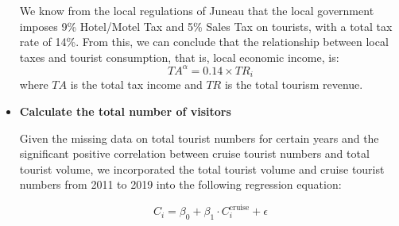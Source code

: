 \documentclass{mcmthesis}
\begin{document}
\begin{itemize}
  We know from the local regulations of Juneau that the local government imposes 9\% Hotel/Motel Tax and 5\% Sales Tax on tourists, with a total tax rate of 14\%. From this, we can conclude that the relationship between local taxes and tourist consumption, that is, local economic income, is:
  \begin{equation}
    \label{eq:tax}
    TA^\alpha = 0.14 \times TR_i
  \end{equation}
  where $TA$ is the total tax income and $TR$ is the total tourism revenue.
  \item \textbf{Calculate the total number of visitors}\par
  Given the missing data on total tourist numbers for certain years and the significant positive correlation between cruise tourist numbers and total tourist volume, we incorporated the total tourist volume and cruise tourist numbers from 2011 to 2019 into the following regression equation:

\begin{equation}
  \label{eq:totalvisitor}
C_i = \beta_0 + \beta_1 \cdot C_i^{\text{cruise}} + \epsilon
\end{equation}


\end{itemize}
\end{document}
